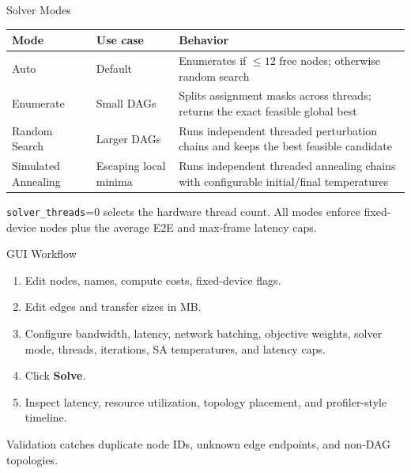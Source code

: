 \documentclass[aspectratio=169]{beamer}
\begin{document}
\begin{frame}{Solver Modes}
  \begin{table}
    \centering
    \small
    \begin{tabular}{p{}p{}p{}}
      \toprule
      Mode & Use case & Behavior \\
      \midrule
      Auto & Default & Enumerates if $\leq 12$ free nodes; otherwise random search \\
      Enumerate & Small DAGs & Splits assignment masks across threads; returns the exact feasible global best \\
      Random Search & Larger DAGs & Runs independent threaded perturbation chains and keeps the best feasible candidate \\
      Simulated Annealing & Escaping local minima & Runs independent threaded annealing chains with configurable initial/final temperatures \\
      \bottomrule
    \end{tabular}
  \end{table}
  \vspace{0.5em}
  \texttt{solver\_threads}=0 selects the hardware thread count. All modes enforce fixed-device nodes plus the average E2E and max-frame latency caps.
\end{frame}

\begin{frame}{GUI Workflow}
  \begin{enumerate}
    \item Edit nodes, names, compute costs, fixed-device flags.
    \item Edit edges and transfer sizes in MB.
    \item Configure bandwidth, latency, network batching, objective weights, solver mode, threads, iterations, SA temperatures, and latency caps.
    \item Click \textbf{Solve}.
    \item Inspect latency, resource utilization, topology placement, and profiler-style timeline.
  \end{enumerate}
  \vspace{0.5em}
  Validation catches duplicate node IDs, unknown edge endpoints, and non-DAG topologies.
\end{frame}
\end{document}
